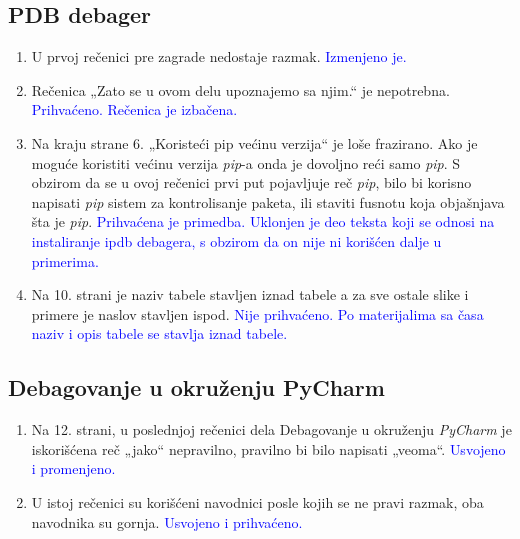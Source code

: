 \documentclass[a4paper]{report}
\newcommand{\odgovor}[1]{\textcolor{blue}{#1}}
\begin{document}
\subsection{PDB debager}
\begin{enumerate}
    \item U prvoj rečenici pre zagrade nedostaje razmak.
    \odgovor{Izmenjeno je.}
    \item Rečenica „Zato se u ovom delu upoznajemo sa njim.“ je nepotrebna.
    \odgovor{Prihvaćeno. Rečenica je izbačena.}
    \item Na kraju strane 6. „Koristeći pip većinu verzija“ je loše frazirano. Ako je moguće koristiti većinu verzija \emph{pip}-a  onda je dovoljno reći samo \emph{pip}. S obzirom da se u ovoj rečenici prvi put pojavljuje reč \emph{pip}, bilo bi korisno napisati \emph{pip} sistem za kontrolisanje paketa, ili staviti fusnotu koja objašnjava šta je \emph{pip}.
    \odgovor{Prihvaćena je primedba. Uklonjen je deo teksta koji se odnosi na instaliranje ipdb debagera, s obzirom da on nije ni korišćen dalje u primerima.}
    \item Na 10. strani je naziv tabele stavljen iznad tabele a za sve ostale slike i primere je naslov stavljen ispod.
    \odgovor{Nije prihvaćeno. Po materijalima sa časa naziv i opis tabele se stavlja iznad tabele.}
\end{enumerate}
\subsection{Debagovanje u okruženju PyCharm}
\begin{enumerate}
    \item Na 12. strani, u poslednjoj rečenici dela Debagovanje u okruženju \emph{PyCharm} je iskorišćena reč „jako“ nepravilno, pravilno bi bilo napisati „veoma“.
    \odgovor{Usvojeno i promenjeno.}
    \item U istoj rečenici su korišćeni navodnici posle kojih se ne pravi razmak, oba navodnika su gornja.
    \odgovor{Usvojeno i prihvaćeno.}
\end{enumerate}
\end{document}
